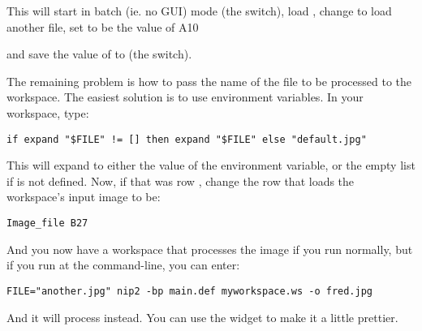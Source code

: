 \noindent
This will start \nip{} in batch (ie. no GUI) mode (the  switch), 
load , change  to load another file, set 
to be the value of A10

and save the value of  to  (the
 switch).

The remaining problem is how to pass the name of the file to be processed to
the workspace. The easiest solution is to use environment variables. In your
workspace, type:

\begin{verbatim}
if expand "$FILE" != [] then expand "$FILE" else "default.jpg"
\end{verbatim}

\noindent
This will expand to either the value of the  environment variable,
or the empty list if  is not defined. Now, if that was row
, change the row that loads the workspace's input image to be:

\begin{verbatim}
Image_file B27
\end{verbatim}

\noindent
And you now have a workspace that processes the image  if you
run \nip{} normally, but if you run at the command-line, you can enter:

\begin{verbatim}
FILE="another.jpg" nip2 -bp main.def myworkspace.ws -o fred.jpg
\end{verbatim}

\noindent
And it will process  instead. You can use the
 widget to make it a little prettier.

